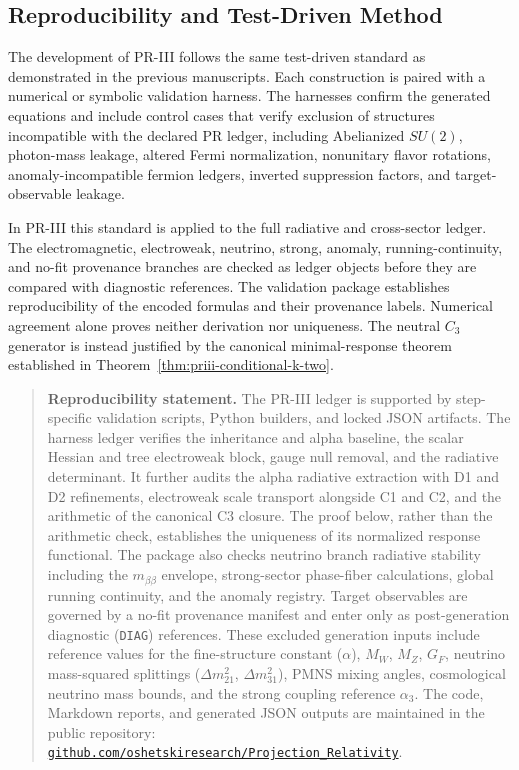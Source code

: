 \documentclass[11pt]{article}
\begin{document}
\subsection{Reproducibility and Test-Driven Method}
\label{sec:intro_reproducibility}

The development of PR-III follows the same test-driven standard as demonstrated in the previous manuscripts. Each construction is paired with a numerical or symbolic validation harness. The harnesses confirm the generated equations and include control cases that verify exclusion of structures incompatible with the declared PR ledger, including Abelianized $SU(2)$, photon-mass leakage, altered Fermi normalization, nonunitary flavor rotations, anomaly-incompatible fermion ledgers, inverted suppression factors, and target-observable leakage.

In PR-III this standard is applied to the full radiative and cross-sector ledger. The electromagnetic, electroweak, neutrino, strong, anomaly, running-continuity, and no-fit provenance branches are checked as ledger objects before they are compared with diagnostic references. The validation package establishes reproducibility of the encoded formulas and their provenance labels.  Numerical agreement alone proves neither derivation nor uniqueness.  The neutral \(C_3\) generator is instead justified by the canonical minimal-response theorem established in Theorem~\ref{thm:priii-conditional-k-two}.

\begin{quote}
\small
\textbf{Reproducibility statement.}
The PR-III ledger is supported by step-specific validation scripts, Python builders, and locked JSON artifacts. The harness ledger verifies the inheritance and alpha baseline, the scalar Hessian and tree electroweak block, gauge null removal, and the radiative determinant. It further audits the alpha radiative extraction with D1 and D2 refinements, electroweak scale transport alongside C1 and C2, and the arithmetic of the canonical C3 closure.  The proof below, rather than the arithmetic check, establishes the uniqueness of its normalized response functional.  The package also checks neutrino branch radiative stability including the $m_{\beta\beta}$ envelope, strong-sector phase-fiber calculations, global running continuity, and the anomaly registry. Target observables are governed by a no-fit provenance manifest and enter only as post-generation diagnostic (\texttt{DIAG}) references. These excluded generation inputs include reference values for the fine-structure constant ($\alpha$), $M_W$, $M_Z$, $G_F$, neutrino mass-squared splittings ($\Delta m^2_{21}$, $\Delta m^2_{31}$), PMNS mixing angles, cosmological neutrino mass bounds, and the strong coupling reference $\alpha_3$. The code, Markdown reports, and generated JSON outputs are maintained in the public repository:
\href{https://github.com/oshetskiresearch/Projection_Relativity}{\texttt{github.com/oshetskiresearch/Projection\_Relativity}}.
\end{quote}
\end{document}
